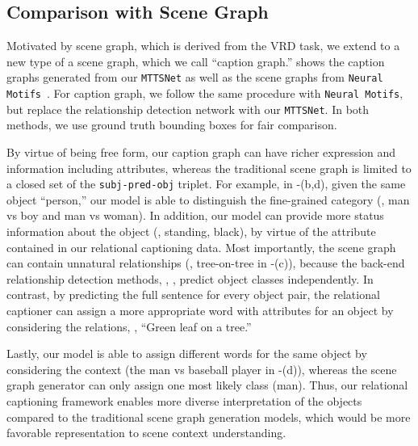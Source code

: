 \subsection{Comparison with Scene Graph}
{
Motivated by scene graph, which is derived from the VRD task,
we extend to a new type of a scene graph, which we call ``caption graph.'' 
 shows the caption graphs generated from our \texttt{MTTSNet} as well as the scene graphs from \texttt{Neural Motifs}~\cite{zellers2018neural}.
{For caption graph, we follow the same procedure with \texttt{Neural Motifs}, but replace the relationship detection network {with} our \texttt{MTTSNet}.}
In both methods, we use ground truth bounding boxes 
for fair comparison.








By virtue of being free form, our caption graph can have richer expression and information including attributes, whereas the traditional scene graph is limited to a closed set of the \texttt{subj-pred-obj} triplet.
For example, in -(b,d), given the same object ``person,'' our model is able to distinguish the fine-grained category (\ie, man vs boy and man vs woman).
In addition, our model can provide more status information about the object (\eg, standing, black), by virtue of the attribute contained in our relational captioning data.
Most importantly, the scene graph can contain unnatural relationships (\eg, tree-on-tree in -(c)), because the back-end relationship detection methods, \eg, \cite{zellers2018neural}, predict object classes independently.
In contrast, by predicting the full sentence for every object pair, {the} relational captioner can assign a more appropriate word with attributes for an object by considering the relations, \eg, ``Green leaf on a tree.''



Lastly, our model is able to assign different words for the same object by considering the context (the man vs baseball player in -(d)), whereas the scene graph generator can only assign one most likely class (man).
Thus, our relational captioning framework enables more diverse interpretation of the objects compared to the traditional scene graph generation models, which would be more favorable representation to scene context understanding.
}




